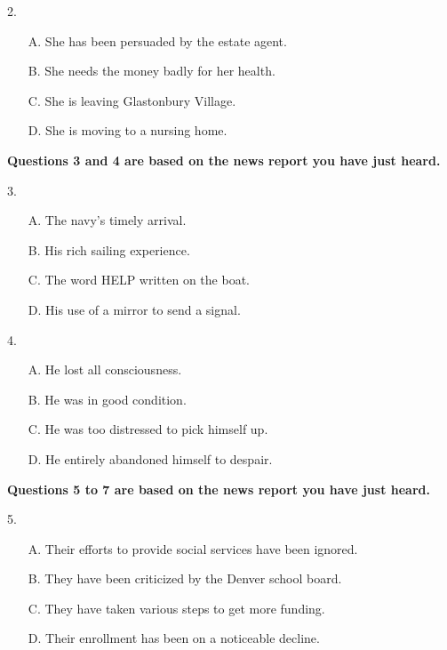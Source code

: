 \documentclass[UTF8,11pt]{ctexart}
\begin{document}
2.


\begin{itemize}[leftmargin=2em,itemsep=.2em,topsep=.4em]\item[A.] She has been persuaded by the estate agent.
\item[B.] She needs the money badly for her health.
\item[C.] She is leaving Glastonbury Village.
\item[D.] She is moving to a nursing home.
\end{itemize}

\textbf{Questions 3 and 4 are based on the news report you have just heard.}


3.


\begin{itemize}[leftmargin=2em,itemsep=.2em,topsep=.4em]\item[A.] The navy’s timely arrival.
\item[B.] His rich sailing experience.
\item[C.] The word HELP written on the boat.
\item[D.] His use of a mirror to send a signal.
\end{itemize}

4.


\begin{itemize}[leftmargin=2em,itemsep=.2em,topsep=.4em]\item[A.] He lost all consciousness.
\item[B.] He was in good condition.
\item[C.] He was too distressed to pick himself up.
\item[D.] He entirely abandoned himself to despair.
\end{itemize}

\textbf{Questions 5 to 7 are based on the news report you have just heard.}


5.


\begin{itemize}[leftmargin=2em,itemsep=.2em,topsep=.4em]\item[A.] Their efforts to provide social services have been ignored.
\item[B.] They have been criticized by the Denver school board.
\item[C.] They have taken various steps to get more funding.
\item[D.] Their enrollment has been on a noticeable decline.
\end{itemize}
\end{document}
